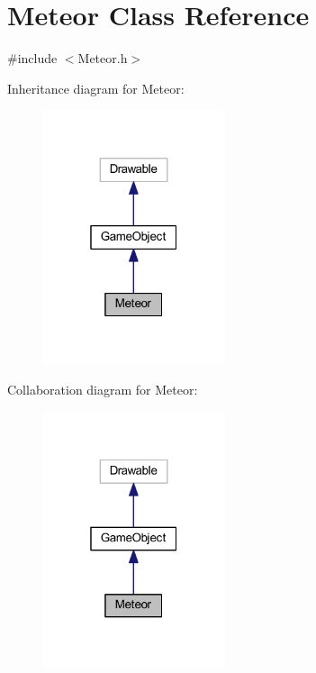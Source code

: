 \hypertarget{class_meteor}{}\section{Meteor Class Reference}
\label{class_meteor}


{\ttfamily \#include $<$Meteor.\+h$>$}



Inheritance diagram for Meteor\+:
\nopagebreak
\begin{figure}[H]
\begin{center}
\leavevmode
\includegraphics[width=151pt]{class_meteor__inherit__graph}
\end{center}
\end{figure}


Collaboration diagram for Meteor\+:
\nopagebreak
\begin{figure}[H]
\begin{center}
\leavevmode
\includegraphics[width=151pt]{class_meteor__coll__graph}
\end{center}
\end{figure}
